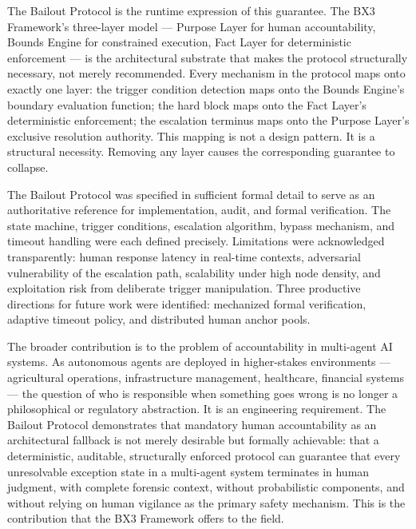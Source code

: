 The Bailout Protocol is the runtime expression of this guarantee. The BX3 Framework's three-layer model --- Purpose Layer for human accountability, Bounds Engine for constrained execution, Fact Layer for deterministic enforcement --- is the architectural substrate that makes the protocol structurally necessary, not merely recommended. Every mechanism in the protocol maps onto exactly one layer: the trigger condition detection maps onto the Bounds Engine's boundary evaluation function; the hard block maps onto the Fact Layer's deterministic enforcement; the escalation terminus maps onto the Purpose Layer's exclusive resolution authority. This mapping is not a design pattern. It is a structural necessity. Removing any layer causes the corresponding guarantee to collapse.

The Bailout Protocol was specified in sufficient formal detail to serve as an authoritative reference for implementation, audit, and formal verification. The state machine, trigger conditions, escalation algorithm, bypass mechanism, and timeout handling were each defined precisely. Limitations were acknowledged transparently: human response latency in real-time contexts, adversarial vulnerability of the escalation path, scalability under high node density, and exploitation risk from deliberate trigger manipulation. Three productive directions for future work were identified: mechanized formal verification, adaptive timeout policy, and distributed human anchor pools.

The broader contribution is to the problem of accountability in multi-agent AI systems. As autonomous agents are deployed in higher-stakes environments --- agricultural operations, infrastructure management, healthcare, financial systems --- the question of who is responsible when something goes wrong is no longer a philosophical or regulatory abstraction. It is an engineering requirement. The Bailout Protocol demonstrates that mandatory human accountability as an architectural fallback is not merely desirable but formally achievable: that a deterministic, auditable, structurally enforced protocol can guarantee that every unresolvable exception state in a multi-agent system terminates in human judgment, with complete forensic context, without probabilistic components, and without relying on human vigilance as the primary safety mechanism. This is the contribution that the BX3 Framework offers to the field.
